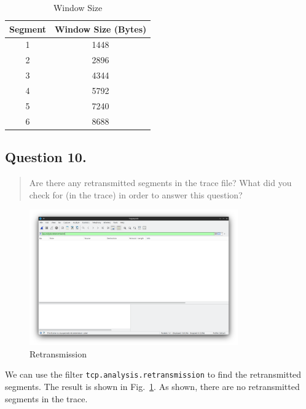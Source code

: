 \documentclass{cshwk}
\begin{document}
\begin{table}[htbp]
    \centering
    \caption{Window Size}
    \label{tab:Window}
    \begin{tabular}{cc}
        \toprule
        Segment & Window Size (Bytes) \\
        \midrule
        1       & 1448                \\
        2       & 2896                \\
        3       & 4344                \\
        4       & 5792                \\
        5       & 7240                \\
        6       & 8688                \\
        \bottomrule
    \end{tabular}
\end{table}

\subsection*{Question 10.}
\begin{quote}
    Are there any retransmitted segments in the trace file? What did you check for (in the trace) in order to answer this question?
\end{quote}

\begin{figure}[htbp]
    \centering
    \includegraphics[width=0.8\textwidth]{./lab3-8.png}
    \caption{Retransmission}
    \label{fig:Retransmission}
\end{figure}

We can use the filter \texttt{tcp.analysis.retransmission} to find the retransmitted segments. The result is shown in Fig.~\ref{fig:Retransmission}. As shown, there are no retransmitted segments in the trace.
\end{document}

